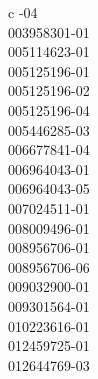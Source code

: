\begin{deluxetable}{c}
\tablewidth{\linewidth}
-04\\
003958301-01\\
005114623-01\\
005125196-01\\
005125196-02\\
005125196-04\\
005446285-03\\
006677841-04\\
006964043-01\\
006964043-05\\
007024511-01\\
008009496-01\\
008956706-01\\
008956706-06\\
009032900-01\\
009301564-01\\
010223616-01\\
012459725-01\\
012644769-03\\
\enddata

\end{deluxetable}


